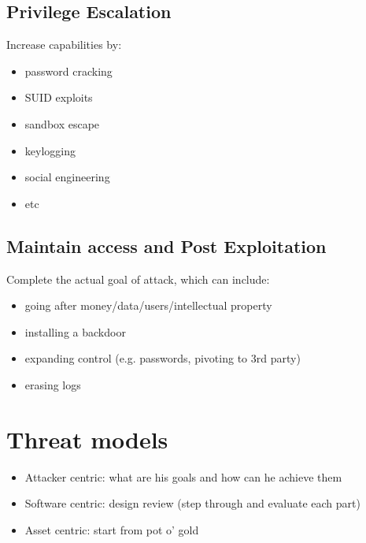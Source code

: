 \documentclass[letterpaper]{article}
\begin{document}
\subsection{Privilege Escalation}
Increase capabilities by:
\begin{itemize}
\item password cracking
\item SUID exploits
\item sandbox escape
\item keylogging
\item social engineering
\item etc
\end{itemize}
	
\subsection{Maintain access and Post Exploitation}
Complete the actual goal of attack, which can include:
\begin{itemize}
\item going after money/data/users/intellectual property
\item installing a backdoor
\item expanding control (e.g. passwords, pivoting to 3rd party)
\item erasing logs
\end{itemize}

\section{Threat models}
\begin{itemize}
\item Attacker centric: what are his goals and how can he achieve them
\item Software centric: design review (step through and evaluate each part)
\item Asset centric: start from pot o' gold
\end{itemize}
\end{document}
